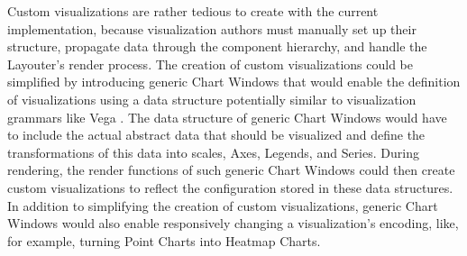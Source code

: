Custom visualizations are rather tedious to create with the current
implementation, because visualization authors must manually set up
their structure, propagate data through the component hierarchy, and
handle the Layouter's render process. The creation of custom
visualizations could be simplified by introducing generic Chart
Windows that would enable the definition of visualizations using a
data structure potentially similar to visualization grammars like Vega
\parencite{Vega}. The data structure of generic Chart Windows would
have to include the actual abstract data that should be visualized and
define the transformations of this data into scales, Axes, Legends,
and Series. During rendering, the render functions of such generic
Chart Windows could then create custom visualizations to reflect the
configuration stored in these data structures. In addition to
simplifying the creation of custom visualizations, generic Chart
Windows would also enable responsively changing a visualization's
encoding, like, for example, turning Point Charts into Heatmap Charts.
